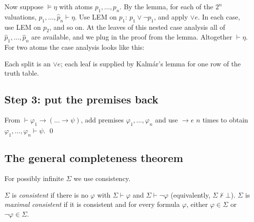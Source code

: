 Now suppose $\models\eta$ with atoms $p_1,\dots,p_n$. By the lemma, for each of the
$2^n$ valuations, $\hat p_1,\dots,\hat p_n\vdash\eta$. Use LEM on $p_1$:
$p_1\lor\neg p_1$, and apply $\lor e$. In each case, use LEM on $p_2$, and so on. At the
leaves of this nested case analysis all of $\hat p_1,\dots,\hat p_n$ are available, and we
plug in the proof from the lemma. Altogether $\vdash\eta$.
For two atoms the case analysis looks like this:
\begin{center}

\small Each split is an $\lor e$; each leaf is supplied by Kalm\'ar's lemma for one row of the truth table.
\end{center}

\subsection*{Step 3: put the premises back}
From $\vdash\varphi_1\to(\dots\to\psi)$, add premises $\varphi_1,\dots,\varphi_n$ and use
$\to e$ $n$ times to obtain $\varphi_1,\dots,\varphi_n\vdash\psi$. \qed

\subsection{The general completeness theorem}

For possibly infinite $\Sigma$ we use consistency.

\begin{definition}
$\Sigma$ is \emph{consistent} if there is no $\varphi$ with $\Sigma\vdash\varphi$ and
$\Sigma\vdash\neg\varphi$ (equivalently, $\Sigma\nvdash\bot$). $\Sigma$ is
\emph{maximal consistent} if it is consistent and for every formula $\varphi$, either
$\varphi\in\Sigma$ or $\neg\varphi\in\Sigma$.
\end{definition}

